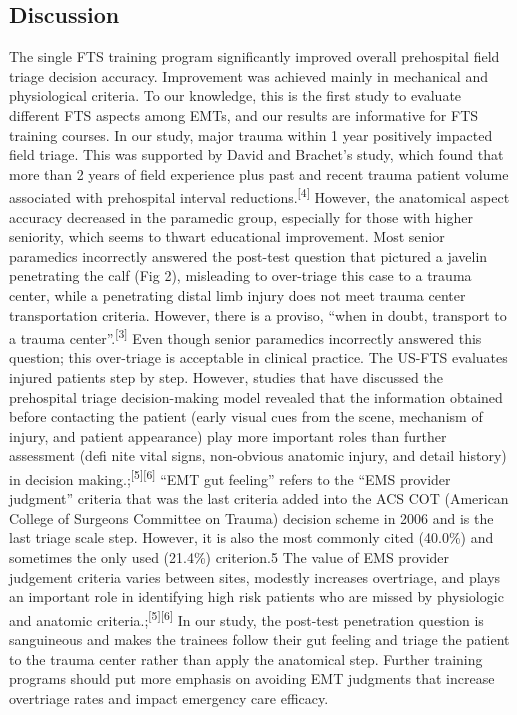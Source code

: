 \documentclass[
  20pt
]{article}
\begin{document}
\begin{multicols}{2}
\hypertarget{discussion}{%
\section{Discussion}\label{discussion}}

The single FTS training program significantly improved overall
prehospital field triage decision accuracy. Improvement was achieved
mainly in mechanical and physiological criteria. To our knowledge, this
is the first study to evaluate different FTS aspects among EMTs, and our
results are informative for FTS training courses. In our study, major
trauma within 1 year positively impacted field triage. This was
supported by David and Brachet's study, which found that more than 2
years of field experience plus past and recent trauma patient volume
associated with prehospital interval
reductions.\textsuperscript{{[}4{]}} However, the anatomical aspect
accuracy decreased in the paramedic group, especially for those with
higher seniority, which seems to thwart educational improvement. Most
senior paramedics incorrectly answered the post-test question that
pictured a javelin penetrating the calf (Fig 2), misleading to
over-triage this case to a trauma center, while a penetrating distal
limb injury does not meet trauma center transportation criteria.
However, there is a proviso, ``when in doubt, transport to a trauma
center''.\textsuperscript{{[}3{]}} Even though senior paramedics
incorrectly answered this question; this over-triage is acceptable in
clinical practice. The US-FTS evaluates injured patients step by step.
However, studies that have discussed the prehospital triage
decision-making model revealed that the information obtained before
contacting the patient (early visual cues from the scene, mechanism of
injury, and patient appearance) play more important roles than further
assessment (defi nite vital signs, non-obvious anatomic injury, and
detail history) in decision
making.;\textsuperscript{{[}5{]}}\textsuperscript{{[}6{]}} ``EMT gut
feeling'' refers to the ``EMS provider judgment'' criteria that was the
last criteria added into the ACS COT (American College of Surgeons
Committee on Trauma) decision scheme in 2006 and is the last triage
scale step. However, it is also the most commonly cited (40.0\%) and
sometimes the only used (21.4\%) criterion.5 The value of EMS provider
judgement criteria varies between sites, modestly increases overtriage,
and plays an important role in identifying high risk patients who are
missed by physiologic and anatomic
criteria.;\textsuperscript{{[}5{]}}\textsuperscript{{[}6{]}} In our
study, the post-test penetration question is sanguineous and makes the
trainees follow their gut feeling and triage the patient to the trauma
center rather than apply the anatomical step. Further training programs
should put more emphasis on avoiding EMT judgments that increase
overtriage rates and impact emergency care efficacy.


\end{multicols}
\end{document}
